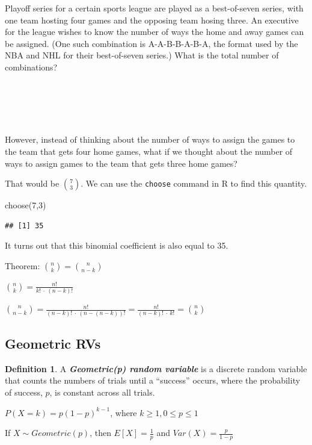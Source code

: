 \documentclass[
  11pt,
]{book}
\newenvironment{Shaded}{\begin{snugshade}}{\end{snugshade}}
\newcommand{\DecValTok}[1]{\textcolor[rgb]{0.00,0.00,0.81}{#1}}
\newcommand{\FunctionTok}[1]{\textcolor[rgb]{0.00,0.00,0.00}{#1}}
\newcommand{\NormalTok}[1]{#1}
\theoremstyle{definition}
\newtheorem{definition}{Definition}[chapter]
\theoremstyle{definition}
\theoremstyle{definition}
\theoremstyle{definition}
\theoremstyle{remark}
\begin{document}
Playoff series for a certain sports league are played as a best-of-seven series, with one team hosting four games and the opposing team hosing three. An executive for the league wishes to know the number of ways the home and away games can be assigned. (One such combination is A-A-B-B-A-B-A, the format used by the NBA and NHL for their best-of-seven series.) What is the total number of combinations?\\
\strut \\
\strut \\
\strut \\

However, instead of thinking about the number of ways to assign the games to the team that gets four home games, what if we thought about the number of ways to assign games to the team that gets three home games?

That would be \(\binom{7}{3}\). We can use the \texttt{choose} command in R to find this quantity.

\begin{Shaded}
\begin{Highlighting}[]
\FunctionTok{choose}\NormalTok{(}\DecValTok{7}\NormalTok{,}\DecValTok{3}\NormalTok{)}
\end{Highlighting}
\end{Shaded}

\begin{verbatim}
## [1] 35
\end{verbatim}

It turns out that this binomial coefficient is also equal to 35.

Theorem: \(\binom{n}{k} = \binom{n}{n-k}\)

\(\binom{n}{k} = \frac{n!}{k!\ \cdot\ (n-k)!}\)

\(\binom{n}{n-k} = \frac{n!}{(n-k)!\ \cdot\ (n-(n-k))!} = \frac{n!}{(n-k)!\ \cdot\ k!} = \binom{n}{k}\)

\newpage

\hypertarget{geometric-rvs}{%
\subsection{Geometric RVs}\label{geometric-rvs}}

\begin{definition}
A \textbf{\emph{Geometric(p) random variable}} is a discrete random variable that counts the numbers of trials until a ``success'' occurs, where the probability of success, \(p\), is constant across all trials.

\(P(X=k) = p(1-p)^{k-1}\), where \(k \geq 1, 0 \leq p \leq 1\)

If \(X \sim Geometric(p)\), then \(E[X]=\frac{1}{p}\) and \(Var(X)=\frac{p}{1-p}\)
\end{definition}
\end{document}

